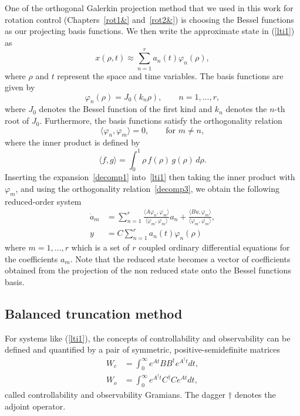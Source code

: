 \documentclass[12pt,lot, lof]{puthesis}
\begin{document}
One of the orthogonal Galerkin projection method that we used in this work for rotation control (Chapters~\ref{rot1&} and~\ref{rot2&}) is choosing the Bessel functions as our projecting basis functions. We then write the approximate state in (\ref{lti1}) as
\begin{equation}
x(\rho,t)  \approx \sum_{n=1}^{r} a_n (t) \varphi_n(\rho),
\label{decomp1}
\end{equation}
where $\rho$ and $t$ represent the space and time variables. The basis functions are given by
\begin{equation}
  \label{decomp2}
  \varphi_n(\rho) = J_0(k_n\rho),\qquad n=1,\ldots,r,
\end{equation}
where $J_0$ denotes the Bessel function of the first kind and $k_n$ denotes the $n$-th root of $J_0$. Furthermore, the basis functions satisfy the orthogonality relation
\begin{equation}
  \label{decomp3}
  \langle \varphi_n,\varphi_m\rangle = 0,\qquad \text{for $m\ne n$},
\end{equation}
where the inner product is defined by
\begin{equation}
\langle f,g \rangle =   \int^1 _0 \rho \, f(\rho) \, g(\rho) \, d\rho.
\end{equation}
 Inserting the expansion~\eqref{decomp1} into~\eqref{lti1} then taking the inner product with~$\varphi_m$, and using the orthogonality relation~\eqref{decomp3}, we obtain the following reduced-order system
% 
\begin{equation}
\begin{aligned}
  \dot a_m &= \sum_{n=1}^r \frac{\langle A  \varphi_n,  \varphi_m\rangle}{\langle \varphi_m,\varphi_m\rangle} a_n +\frac{ \langle B u,\varphi_m\rangle}{\langle \varphi_m,\varphi_m\rangle} ,\\
    y &= C \sum_{n=1}^{r} a_n (t) \varphi_n(\rho)
\end{aligned}
\end{equation}
where $ m=1,\ldots,r$ which is a set of $r$ coupled ordinary differential equations for the coefficients $a_m$. Note that the reduced state becomes a vector of coefficients obtained from the projection of the non reduced state onto the Bessel functions basis.

\subsection{Balanced truncation method}
\label{baltrun}

For systems like (\ref{lti1}), the concepts of controllability and observability can be defined and quantified by a pair of symmetric, positive-semidefinite matrices
\begin{subequations}
\begin{align}
W_c  &= \int_0 ^{\infty} e^{At} B B^{\dagger}  e^{A^{\dagger}t} dt, \\
W_o  &= \int_0 ^{\infty} e^{A^\dagger t}  C^\dagger C  e^{At} dt, 
\end{align}
\label{obscontr}
\end{subequations}
called controllability and observability Gramians. The dagger $\dagger$ denotes the adjoint operator. 
\end{document}
